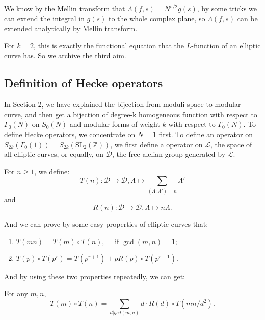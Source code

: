     \begin{remark}
        We know by the Mellin transform that $\Lambda(f,s)=N^{s/2}g(s)$, by some tricks we can extend the integral in $g(s)$ to the whole complex plane, so $\Lambda(f,s)$ can be extended analytically by Mellin transform.
    \end{remark}

    For $k=2$, this is exactly the functional equation that the $L$-function of an  elliptic curve has. So we archive the third aim.

    \subsection{Definition of Hecke operators}

    In Section 2, we have explained the bijection from moduli space to  modular curve, and then get a bijection of degree-k homogeneous function with respect to $\Gamma_0(N )$ on $S_0(N )$ and modular forms of weight $k$ with respect to $\Gamma_0(N )$. 
    To define Hecke operators, we concentrate on $N=1$ first. To define an operator on $S_{2k}(\Gamma_0(1))=S_{2k}(\mathrm{SL}_2(\mathbb{Z}))$, we first define a operator on  $\mathcal{L}$, the space of all elliptic curves, or equally, on $\mathcal{D}$, the free alelian group generated by $\mathcal{L}$.

    For $n\geq 1$, we define:
    $$T(n): \mathcal{D} \to \mathcal{D}, \Lambda\mapsto \sum_{(\Lambda:\Lambda')=n}\Lambda'$$
    and
    $$R(n): \mathcal{D} \to \mathcal{D}, \Lambda\mapsto n\Lambda.$$

    And we can prove by some easy properties of elliptic curves that:

    \begin{proposition}
        \begin{enumerate}
            \item $T(m n)  =T(m)\circ  T(n), \quad \text { if } \operatorname{gcd}(m, n)=1 ;$
            \item $T(p) \circ T\left(p^{r}\right)  =T\left(p^{r+1}\right)+pR(p)\circ T\left(p^{r-1}\right).$
        \end{enumerate}
    \end{proposition}

    And by using these two properties repeatedly, we can get:
    
    \begin{corollary}
        For any $m,n$,
        $$T(m)\circ T(n)=\sum_{d|gcd(m,n)} d\cdot R(d)\circ T(mn/d^2).$$
    \end{corollary}

